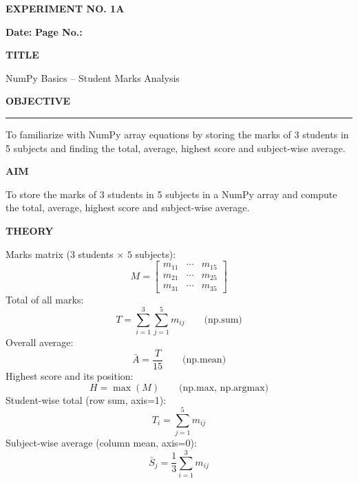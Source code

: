 \documentclass[11pt,twoside]{article}
\newcommand{\expheading}[1]{{\fontsize{14}{17}\selectfont\textbf{#1}\par}}
\newcommand{\fullrule}{\noindent\rule{\textwidth}{0.6pt}\par}
\begin{document}
{\setlength{\parskip}{1pt}\setlength{\abovedisplayskip}{2pt}\setlength{\belowdisplayskip}{2pt}
\begin{center}
\expheading{EXPERIMENT NO. 1A}
\end{center}
\vspace{2pt}

\noindent\textbf{Date:} \underline{\hspace{2.6cm}} \hfill \textbf{Page No.:} \underline{\hspace{2.6cm}}\par
\vspace{6pt}

\expheading{TITLE}
\vspace{4pt}
\noindent NumPy Basics -- Student Marks Analysis\par
\vspace{4pt}

\expheading{OBJECTIVE}
\vspace{2pt}
\fullrule
\vspace{4pt}
\noindent To familiarize with NumPy array equations by storing the marks of 3 students in 5 subjects and finding the total, average, highest score and subject-wise average. \par
\vspace{4pt}

\expheading{AIM}
\vspace{4pt}
\noindent To store the marks of 3 students in 5 subjects in a NumPy array and compute the total, average, highest score and subject-wise average. \par
\vspace{4pt}

\expheading{THEORY}
\vspace{4pt}
Marks matrix ($3$ students $\times$ $5$ subjects):
\[M=\begin{bmatrix}m_{11} & \cdots & m_{15}\\m_{21} & \cdots & m_{25}\\m_{31} & \cdots & m_{35}\end{bmatrix}\]
Total of all marks:
\[T=\sum_{i=1}^{3}\sum_{j=1}^{5}m_{ij}\qquad\text{(np.sum)}\]
Overall average:
\[\bar{A}=\frac{T}{15}\qquad\text{(np.mean)}\]
Highest score and its position:
\[H=\max(M)\qquad\text{(np.max, np.argmax)}\]
Student-wise total (row sum, axis=1):
\[T_i=\sum_{j=1}^{5}m_{ij}\]
Subject-wise average (column mean, axis=0):
\[\bar{S}_j=\frac{1}{3}\sum_{i=1}^{3}m_{ij}\]
\vspace{4pt}

}
\end{document}
